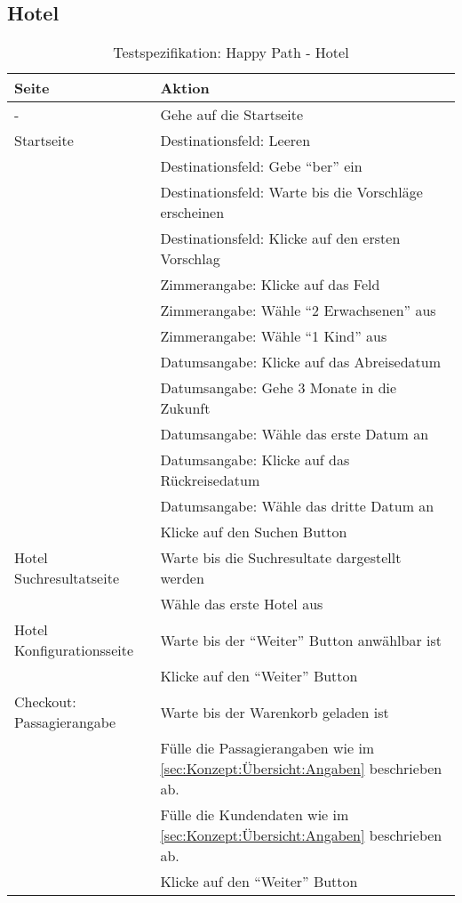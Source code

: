 \subsection{Hotel}
\begin{table}[H] 
	\caption{Testspezifikation: Happy Path - Hotel}
	\centering
		
	\begin{tabularx}{0.9\textwidth}{ | l | X | } 
		\hline 
		\textbf{Seite} & \textbf{Aktion} \\ \hline 
		\multirow{1}{*}{-} & Gehe auf die Startseite \\ \hline
		\multirow{1}{*}{Startseite} & Destinationsfeld: Leeren \\ \cline{2-2}
		& Destinationsfeld: Gebe "`ber"' ein \\ \cline{2-2}
		& Destinationsfeld: Warte bis die Vorschläge erscheinen \\ \cline{2-2}
		& Destinationsfeld: Klicke auf den ersten Vorschlag \\ \cline{2-2}
		& Zimmerangabe: Klicke auf das Feld \\ \cline{2-2}
		& Zimmerangabe: Wähle "`2 Erwachsenen"' aus \\ \cline{2-2}
		& Zimmerangabe: Wähle "`1 Kind"' aus \\ \cline{2-2}
		& Datumsangabe: Klicke auf das Abreisedatum \\ \cline{2-2}
		& Datumsangabe: Gehe 3 Monate in die Zukunft \\ \cline{2-2}
		& Datumsangabe: Wähle das erste Datum an \\ \cline{2-2}
		& Datumsangabe: Klicke auf das Rückreisedatum \\ \cline{2-2}
		& Datumsangabe: Wähle das dritte Datum an \\ \cline{2-2}
		& Klicke auf den Suchen Button \\ \hline
		
		\multirow{1}{*}{Hotel Suchresultatseite} & Warte bis die Suchresultate dargestellt werden \\ \cline{2-2}
		& Wähle das erste Hotel aus \\ \hline
		
		\multirow{1}{*}{Hotel Konfigurationsseite} & Warte bis der "`Weiter"' Button anwählbar ist \\ \cline{2-2}
		& Klicke auf den "`Weiter"' Button \\ \hline
		
		\multirow{1}{*}{Checkout: Passagierangabe} & Warte bis der Warenkorb geladen ist \\ \cline{2-2}
		& Fülle die Passagierangaben wie im \cref{sec:Konzept:Übersicht:Angaben} \nameref{sec:Konzept:Übersicht:Angaben} beschrieben ab. \\ \cline{2-2}
		& Fülle die Kundendaten wie im \cref{sec:Konzept:Übersicht:Angaben} \nameref{sec:Konzept:Übersicht:Angaben} beschrieben ab. \\ \cline{2-2}
		& Klicke auf den "`Weiter"' Button \\ \hline
		

\end{tabularx}
\end{table}

